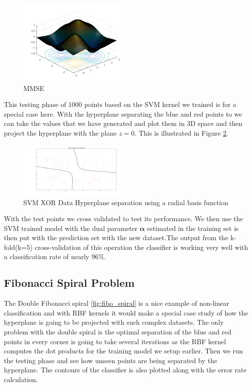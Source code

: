 \documentclass[conference]{IEEEtran}
\begin{document}
\begin{figure}[ht!]
\includegraphics[width=0.5\textwidth]{figs/MMSE.png}
\caption{MMSE}
\label{fig:MMSE} 
\end{figure}

This testing phase of 1000 points based on the SVM kernel we trained is for a special case here. With the hyperplane separating the blue and red points to  
we can take the values that we have generated and plot them in 3D space and then project the hyperplane with the plane $ z=0$. This is illustrated
in Figure \ref{fig:SVM_XOR_HYP}.

\begin{figure}[ht!]
\centering
\includegraphics[width=0.5\textwidth]{figs/SVM_XOR_HYP.png}
\caption{SVM XOR Data Hyperplane separation using a radial basis function}
\label{fig:SVM_XOR_HYP} 
\end{figure}

With the test points we cross validated to test its performance. We then use the SVM trained model with the dual parameter $\bm{\alpha}$ estimated in the training set is then put with the prediction set with the new dataset.The output from the k-fold(k=5) cross-validation of this operation the classifier is working very well with a classification rate of nearly 96\%. 


\subsection{Fibonacci Spiral Problem}
The Double Fibonacci spiral \ref{fig:fibo_spiral} is a nice example of non-linear classification and with RBF kernels it would make a special case study of how the hyperplane is going to be projected with such complex datasets.
The only problem with the double spiral is the optimal separation of the blue and red points in every corner is going to take several iterations as the RBF kernel computes the dot products for the training model we setup earlier. Then we run the testing phase and see how unseen points are being separated by the hyperplane. The contours of the classifier is also plotted along with the error rate calculation.
\end{document}
